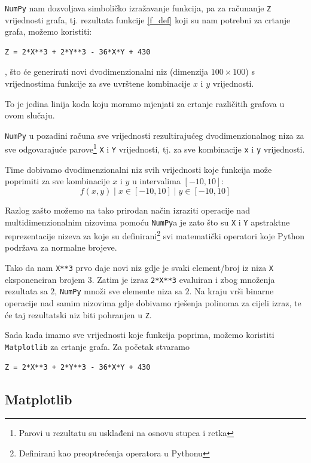 \newpage
\verb|NumPy| nam dozvoljava simboličko izražavanje funkcija,
pa za računanje \verb|Z| vrijednosti grafa, tj. rezultata funkcije \eqref{f_def} koji su nam
potrebni za crtanje grafa, možemo koristiti:
\begin{verbatim}
Z = 2*X**3 + 2*Y**3 - 36*X*Y + 430
\end{verbatim}
, što će generirati novi dvodimenzionalni niz (dimenzija $100\times100$) s vrijednostima
funkcije  za sve uvrštene kombinacije $x$ i $y$ vrijednosti.\par
To je jedina linija koda koju moramo mjenjati za crtanje različitih grafova u ovom slučaju.\par
\verb|NumPy| u pozadini računa sve vrijednosti rezultirajućeg dvodimenzionalnog niza za sve odgovarajuće
parove\footnote{Parovi u rezultatu su usklađeni na osnovu stupca i retka} \verb|X| i \verb|Y| vrijednosti,
tj. za sve kombinacije \verb|x| i \verb|y| vrijednosti.

Time dobivamo dvodimenzionalni niz svih vrijednosti koje funkcija može poprimiti za sve kombinacije $x$ i $y$ u intervalima $[-10, 10]$:
$$
{{f(x,y) \mid x \in [-10, 10]} \mid y \in [-10, 10]}
$$

Razlog zašto možemo na tako prirodan način izraziti operacije nad multidimenzionalnim nizovima pomoću \verb|NumPy|a je zato što su
\verb|X| i \verb|Y| apstraktne reprezentacije nizeva za koje su definirani\footnote{Definirani kao preoptrećenja operatora u Pythonu} svi matematički operatori koje Python podržava za normalne brojeve.\par
Tako da nam \verb|X**3| prvo daje novi niz gdje je svaki element/broj iz niza \verb|X| eksponenciran brojem $3$.
Zatim je izraz \verb|2*X**3| evaluiran i zbog množenja rezultata sa $2$, \verb|NumPy| množi sve elemente niza sa $2$.
Na kraju vrši binarne operacije nad samim nizovima gdje dobivamo rješenja polinoma za cijeli izraz, te će taj rezultatski niz biti pohranjen u \verb|Z|.

Sada kada imamo sve vrijednosti koje funkcija poprima, možemo koristiti \verb|Matplotlib| za crtanje grafa. Za početak stvaramo 
\begin{verbatim}
Z = 2*X**3 + 2*Y**3 - 36*X*Y + 430
\end{verbatim}

\newpage
\subsection{Matplotlib}

